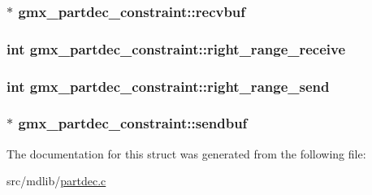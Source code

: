 \hypertarget{structgmx__partdec__constraint_a1820279098a10de9b573d955f05fb87f}{
\subsubsection[{recvbuf}]{$\ast$ {\bf gmx\-\_\-partdec\-\_\-constraint\-::recvbuf}}}\label{structgmx__partdec__constraint_a1820279098a10de9b573d955f05fb87f}
\hypertarget{structgmx__partdec__constraint_abd83f817243d2d42e853fd7f218d532f}{
\subsubsection[{right\-\_\-range\-\_\-receive}]{\setlength{\rightskip}{0pt plus 5cm}int {\bf gmx\-\_\-partdec\-\_\-constraint\-::right\-\_\-range\-\_\-receive}}}\label{structgmx__partdec__constraint_abd83f817243d2d42e853fd7f218d532f}
\hypertarget{structgmx__partdec__constraint_a1bf973f659bee0cb56f508e5b007d4d4}{
\subsubsection[{right\-\_\-range\-\_\-send}]{\setlength{\rightskip}{0pt plus 5cm}int {\bf gmx\-\_\-partdec\-\_\-constraint\-::right\-\_\-range\-\_\-send}}}\label{structgmx__partdec__constraint_a1bf973f659bee0cb56f508e5b007d4d4}
\hypertarget{structgmx__partdec__constraint_ad6204542555bf681bc657094093b631b}{
\subsubsection[{sendbuf}]{$\ast$ {\bf gmx\-\_\-partdec\-\_\-constraint\-::sendbuf}}}\label{structgmx__partdec__constraint_ad6204542555bf681bc657094093b631b}


\-The documentation for this struct was generated from the following file\-:\begin{DoxyCompactItemize}
\item 
src/mdlib/\hyperlink{partdec_8c}{partdec.\-c}\end{DoxyCompactItemize}
